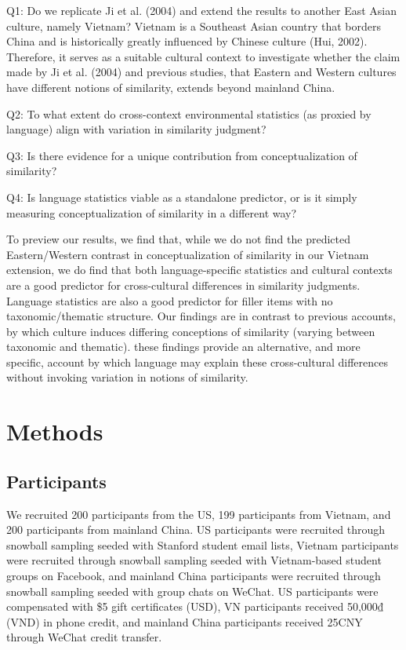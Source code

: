 \documentclass[10pt, letterpaper]{article}
\begin{document}
Q1: Do we replicate Ji et al. (2004) and extend the results to another
East Asian culture, namely Vietnam? Vietnam is a Southeast Asian country
that borders China and is historically greatly influenced by Chinese
culture (Hui, 2002). Therefore, it serves as a suitable cultural context
to investigate whether the claim made by Ji et al. (2004) and previous
studies, that Eastern and Western cultures have different notions of
similarity, extends beyond mainland China.

Q2: To what extent do cross-context environmental statistics (as proxied
by language) align with variation in similarity judgment?

Q3: Is there evidence for a unique contribution from conceptualization
of similarity?

Q4: Is language statistics viable as a standalone predictor, or is it
simply measuring conceptualization of similarity in a different way?~

To preview our results, we find that, while we do not find the predicted
Eastern/Western contrast in conceptualization of similarity in our
Vietnam extension, we do find that both language-specific statistics and
cultural contexts are a good predictor for cross-cultural differences in
similarity judgments. Language statistics are also a good predictor for
filler items with no taxonomic/thematic structure. Our findings are in
contrast to previous accounts, by which culture induces differing
conceptions of similarity (varying between taxonomic and thematic).
these findings provide an alternative, and more specific, account by
which language may explain these cross-cultural differences without
invoking variation in notions of similarity.

\hypertarget{methods}{%
\section{Methods}\label{methods}}

\hypertarget{participants}{%
\subsection{Participants}\label{participants}}

We recruited 200 participants from the US, 199 participants from
Vietnam, and 200 participants from mainland China. US participants were
recruited through snowball sampling seeded with Stanford student email
lists, Vietnam participants were recruited through snowball sampling
seeded with Vietnam-based student groups on Facebook, and mainland China
participants were recruited through snowball sampling seeded with group
chats on WeChat. US participants were compensated with \$5 gift
certificates (USD), VN participants received 50,000₫ (VND) in phone
credit, and mainland China participants received 25CNY through WeChat
credit transfer.
\end{document}
